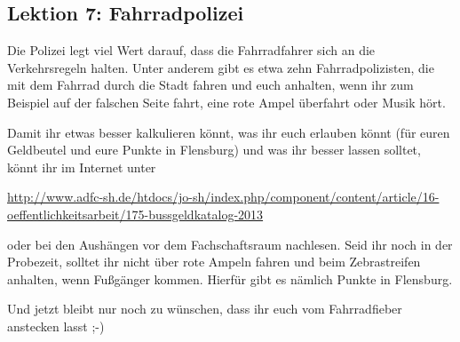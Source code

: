 \begin{multicols}{2}
\subsection*{Lektion 7: Fahrradpolizei}
Die Polizei legt viel Wert darauf, dass die Fahrradfahrer sich an die Verkehrsregeln halten. Unter anderem gibt es etwa zehn Fahrradpolizisten, die mit dem Fahrrad durch die Stadt fahren und euch anhalten, wenn ihr zum Beispiel auf der falschen Seite fahrt, eine rote Ampel überfahrt oder Musik hört.

Damit ihr etwas besser kalkulieren könnt, was ihr euch erlauben könnt (für euren Geldbeutel und eure Punkte in Flensburg) und was ihr besser lassen solltet, könnt ihr im Internet unter

\begin{flushleft}
\hangindent=0.5cm
\url{http://www.adfc-sh.de/htdocs/jo-sh/index.php/component/content/article/16-oeffentlichkeitsarbeit/175-bussgeldkatalog-2013}
\end{flushleft}

oder bei den Aushängen vor dem Fachschaftsraum nachlesen. Seid ihr noch in der Probezeit, solltet ihr nicht über rote Ampeln fahren und beim Zebrastreifen anhalten, wenn Fußgänger kommen. Hierfür gibt es nämlich Punkte in Flensburg.

Und jetzt bleibt nur noch zu wünschen, dass ihr euch vom Fahrradfieber anstecken lasst ;-)

\end{multicols}
